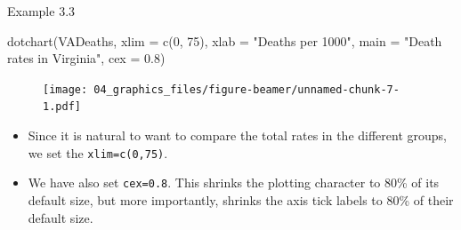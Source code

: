 \documentclass[
  9pt,
  a4paper,
  ignorenonframetext,
  notheorems]{beamer}
\newenvironment{Shaded}{\begin{snugshade}}{\end{snugshade}}
\newcommand{\AttributeTok}[1]{\textcolor[rgb]{0.40,0.45,0.13}{#1}}
\newcommand{\DecValTok}[1]{\textcolor[rgb]{0.68,0.00,0.00}{#1}}
\newcommand{\FloatTok}[1]{\textcolor[rgb]{0.68,0.00,0.00}{#1}}
\newcommand{\FunctionTok}[1]{\textcolor[rgb]{0.28,0.35,0.67}{#1}}
\newcommand{\NormalTok}[1]{\textcolor[rgb]{0.00,0.23,0.31}{#1}}
\newcommand{\StringTok}[1]{\textcolor[rgb]{0.13,0.47,0.30}{#1}}
\begin{document}
\begin{frame}[fragile]
\begin{block}{Example 3.3}
\protect\hypertarget{example-3.3}{}
\begin{Shaded}
\begin{Highlighting}[]
\FunctionTok{dotchart}\NormalTok{(VADeaths, }\AttributeTok{xlim =} \FunctionTok{c}\NormalTok{(}\DecValTok{0}\NormalTok{, }\DecValTok{75}\NormalTok{), }\AttributeTok{xlab =} \StringTok{"Deaths per 1000"}\NormalTok{,}
         \AttributeTok{main =} \StringTok{"Death rates in Virginia"}\NormalTok{, }\AttributeTok{cex =} \FloatTok{0.8}\NormalTok{)}
\end{Highlighting}
\end{Shaded}

\begin{figure}

{\centering \texttt{[image: 04\_graphics\_files/figure-beamer/unnamed-chunk-7-1.pdf]}

}

\end{figure}

\begin{itemize}
\item
  Since it is natural to want to compare the total rates in the
  different groups, we set the \texttt{xlim=c(0,75)}.
\item
  We have also set \texttt{cex=0.8}. This shrinks the plotting character
  to 80\% of its default size, but more importantly, shrinks the axis
  tick labels to 80\% of their default size.
\end{itemize}
\end{block}
\end{frame}
\end{document}

